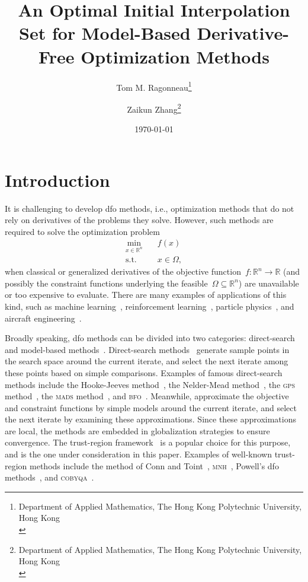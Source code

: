 \documentclass[draft]{article}
\title{An Optimal Initial Interpolation Set for Model-Based Derivative-Free Optimization Methods}
\author{
    Tom M. Ragonneau\thanks{
        Department of Applied Mathematics, The Hong Kong Polytechnic University, Hong Kong\\
        \email{tom.ragonneau@polyu.edu.hk} \quad \website[globe-asia]{www.tomragonneau.com}
    }\orcid{0000-0003-2717-2876} \and
    Zaikun Zhang\thanks{
        Department of Applied Mathematics, The Hong Kong Polytechnic University, Hong Kong\\
        \email{zaikun.zhang@polyu.edu.hk} \quad \website[globe-asia]{www.zhangzk.net}
    }\orcid{0000-0001-8934-8190}
}
\date{\today}
\numberwithin{equation}{section}
\theoremstyle{definition}
\newcommand{\fset}{\Omega}
\newcommand{\obj}{f}
\newcommand{\R}{\mathbb{R}}
\newcommand{\solvername}[1]{\textsc{#1}\xspace}
\begin{document}
\maketitle

\begin{abstract}
\end{abstract}

\section{Introduction}

It is challenging to develop \gls{dfo} methods, i.e., optimization methods that do not rely on derivatives of the problems they solve.
However, such methods are required to solve the optimization problem
\begin{equation}
    \label{eq:nlp}
    \begin{aligned}
        \min_{x \in \R^n}   & \quad \obj(x)\\
        \text{s.t.}         & \quad x \in \fset,
    \end{aligned}
\end{equation}
when classical or generalized derivatives of the objective function~$\obj : \R^n \to \R$ (and possibly the constraint functions underlying the feasible~$\fset \subseteq \R^n$) are unavailable or too expensive to evaluate.
There are many examples of applications of this kind, such as machine learning~\cite{Ghanbari_Scheinberg_2017}, reinforcement learning~\cite{Qian_Yu_2021}, particle physics~\cite{Eldred_Etal_2022}, and aircraft engineering~\cite{Gazaix_Etal_2019}.

Broadly speaking, \gls{dfo} methods can be divided into two categories: direct-search and model-based methods~\cite{Conn_Scheinberg_Vicente_2009}.
Direct-search methods~\cite{Kolda_Lewis_Torczon_2003} generate sample points in the search space around the current iterate, and select the next iterate among these points based on simple comparisons.
Examples of famous direct-search methods include the Hooke-Jeeves method~\cite{Hooke_Jeeves_1961}, the Nelder-Mead method~\cite{Nelder_Mead_1965}, the \solvername{gps} method~\cite{Booker_Etal_1999}, the \solvername{mads} method~\cite{Audet_Dennis_2006}, and \solvername{bfo}~\cite{Porcelli_Toint_2017,Porcelli_Toint_2022}.
Meanwhile,  approximate the objective and constraint functions by simple models around the current iterate, and select the next iterate by examining these approximations.
Since these approximations are local, the methods are embedded in globalization strategies to ensure convergence.
The trust-region framework~\cite{Conn_Gould_Toint_2000} is a popular choice for this purpose, and is the one under consideration in this paper.
Examples of well-known trust-region methods include the method of Conn and Toint~\cite{Conn_Toint_1996}, \solvername{mnh}~\cite{Wild_2008}, Powell's \gls{dfo} methods~\cite{Powell_1994,Powell_2002,Powell_2006,Powell_2009}, and \solvername{cobyqa}~\cite{Ragonneau_2022,Ragonneau_Zhang_2023}.
\end{document}
